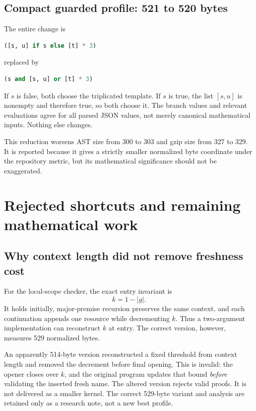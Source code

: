\documentclass[11pt,letterpaper]{article}
\theoremstyle{definition}\newtheorem{definition}[theorem]{Definition}
\theoremstyle{remark}\newtheorem{remark}[theorem]{Remark}
\begin{document}
\subsection{Compact guarded profile: 521 to 520 bytes}

The entire change is
\begin{lstlisting}[language=Python]
([s, u] if s else [t] * 3)
\end{lstlisting}
replaced by
\begin{lstlisting}[language=Python]
(s and [s, u] or [t] * 3)
\end{lstlisting}
If $s$ is false, both choose the triplicated template. If $s$ is true,
the list $[s,u]$ is nonempty and therefore true, so both choose it.
The branch values and relevant evaluations agree for all parsed JSON
values, not merely canonical mathematical inputs. Nothing else changes.

This reduction worsens AST size from 300 to 303 and gzip size from 327
to 329. It is reported because it gives a strictly smaller normalized
byte coordinate under the repository metric, but its mathematical
significance should not be exaggerated.

\section{Rejected shortcuts and remaining mathematical work}
\label{sec:limits}

\subsection{Why context length did not remove freshness cost}

For the local-scope checker, the exact entry invariant is
\[
 k=1-|g|.
\]
It holds initially, major-premise recursion preserves the same context,
and each continuation appends one resource while decrementing $k$.
Thus a two-argument implementation can reconstruct $k$ at entry.
The correct version, however, measures 529 normalized bytes.

An apparently 514-byte version reconstructed a fixed threshold from
context length and removed the decrement before final opening. This is
invalid: the opener closes over $k$, and the original program updates
that bound \emph{before} validating the inserted fresh name. The altered
version rejects valid proofs. It is not delivered as a smaller kernel.
The correct 529-byte variant and analysis are retained only as a research
note, not a new best profile.
\end{document}
